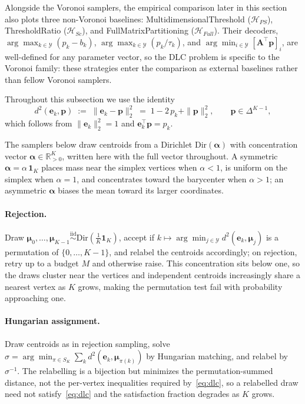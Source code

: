 Alongside the Voronoi samplers, the empirical comparison later in this section also plots three non-Voronoi baselines: MultidimensionalThreshold ($\mathcal{H}_{PS}$), ThresholdRatio ($\mathcal{H}_{Sc}$), and FullMatrixPartitioning ($\mathcal{H}_{Full}$). Their decoders, $\arg\max_{k \in \mathcal{Y}} (p_k - b_k)$, $\arg\max_{k \in \mathcal{Y}} (p_k / \tau_k)$, and $\arg\min_{i \in \mathcal{Y}} [\mathbf{A}^\top\mathbf{p}]_i$, are well-defined for any parameter vector, so the DLC problem is specific to the Voronoi family: these strategies enter the comparison as external baselines rather than fellow Voronoi samplers.

Throughout this subsection we use the identity
\begin{equation}
    d^2(\mathbf{e}_k, \mathbf{p}) \;:=\; \|\mathbf{e}_k - \mathbf{p}\|_2^2 \;=\; 1 - 2\,p_k + \|\mathbf{p}\|_2^2, \qquad \mathbf{p} \in \Delta^{K-1},
    \label{eq:dsq_identity}
\end{equation}
which follows from $\|\mathbf{e}_k\|_2^2 = 1$ and $\mathbf{e}_k^\top \mathbf{p} = p_k$.

The samplers below draw centroids from a Dirichlet $\mathrm{Dir}(\boldsymbol{\alpha})$ with concentration vector $\boldsymbol{\alpha} \in \mathbb{R}^K_{>0}$, written here with the full vector throughout. A symmetric $\boldsymbol{\alpha} = \alpha\,\mathbf{1}_K$ places mass near the simplex vertices when $\alpha < 1$, is uniform on the simplex when $\alpha = 1$, and concentrates toward the barycenter when $\alpha > 1$; an asymmetric $\boldsymbol{\alpha}$ biases the mean toward its larger coordinates.

\paragraph{Rejection.} Draw $\boldsymbol{\mu}_0,\ldots,\boldsymbol{\mu}_{K-1} \overset{\mathrm{iid}}{\sim} \mathrm{Dir}(\tfrac{1}{K}\mathbf{1}_K)$, accept if $k \mapsto \arg\min_{j \in \mathcal{Y}} d^2(\mathbf{e}_k,\boldsymbol{\mu}_j)$ is a permutation of $\{0,\ldots,K-1\}$, and relabel the centroids accordingly; on rejection, retry up to a budget $M$ and otherwise raise. This concentration sits below one, so the draws cluster near the vertices and independent centroids increasingly share a nearest vertex as $K$ grows, making the permutation test fail with probability approaching one.

\paragraph{Hungarian assignment.} Draw centroids as in rejection sampling, solve $\sigma = \arg\min_{\pi \in S_K} \sum_k d^2(\mathbf{e}_k,\boldsymbol{\mu}_{\pi(k)})$ by Hungarian matching, and relabel by $\sigma^{-1}$. The relabelling is a bijection but minimizes the permutation-summed distance, not the per-vertex inequalities required by~\eqref{eq:dlc}, so a relabelled draw need not satisfy~\eqref{eq:dlc} and the satisfaction fraction degrades as $K$ grows.

